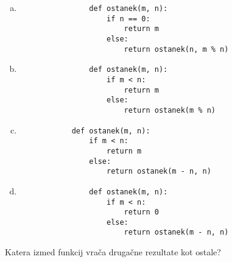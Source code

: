 \documentclass[arhiv, 10pt]{../izpit}
\begin{document}
        \begin{multicols}{2}
        \begin{enumerate}[(a)]
\item 
                \begin{verbatim}
                def ostanek(m, n):
                    if n == 0:
                        return m
                    else:
                        return ostanek(n, m % n)
                \end{verbatim}
            
\item 
                \begin{verbatim}
                def ostanek(m, n):
                    if m < n:
                        return m
                    else:
                        return ostanek(m % n)
                \end{verbatim}
            
\item 
            \begin{verbatim}
            def ostanek(m, n):
                if m < n:
                    return m
                else:
                    return ostanek(m - n, n)
            \end{verbatim}
        
\item 
                \begin{verbatim}
                def ostanek(m, n):
                    if m < n:
                        return 0
                    else:
                        return ostanek(m - n, n)
                \end{verbatim}
            
\end{enumerate}

        \end{multicols}
    
        \naloga*
        
        Katera izmed funkcij vrača drugačne rezultate kot ostale?
    
\end{document}
